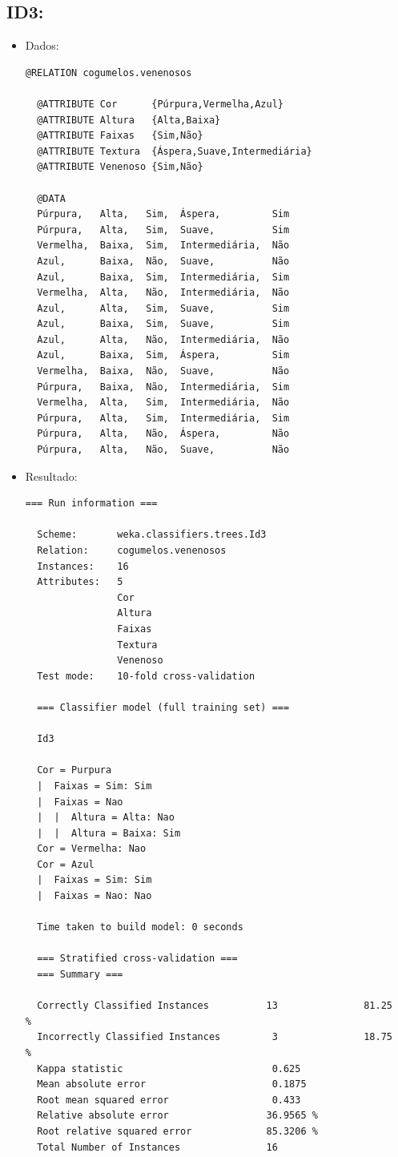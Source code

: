 \documentclass[
    article,            %
    11pt,               %
    oneside,            %
    a4paper,            %
    english,            %
    brazil,             %
    sumario=tradicional,
    ]{abntex2}
\begin{document}
\subsection{\textbf{ID3:}}
\begin{itemize}
  \item Dados:
  \begin{Verbatim}[frame=single, fontsize=\tiny]
  @RELATION cogumelos.venenosos

  @ATTRIBUTE Cor      {Púrpura,Vermelha,Azul}
  @ATTRIBUTE Altura   {Alta,Baixa}
  @ATTRIBUTE Faixas   {Sim,Não}
  @ATTRIBUTE Textura  {Áspera,Suave,Intermediária}
  @ATTRIBUTE Venenoso {Sim,Não}

  @DATA
  Púrpura,   Alta,   Sim,  Áspera,         Sim
  Púrpura,   Alta,   Sim,  Suave,          Sim
  Vermelha,  Baixa,  Sim,  Intermediária,  Não
  Azul,      Baixa,  Não,  Suave,          Não
  Azul,      Baixa,  Sim,  Intermediária,  Sim
  Vermelha,  Alta,   Não,  Intermediária,  Não
  Azul,      Alta,   Sim,  Suave,          Sim
  Azul,      Baixa,  Sim,  Suave,          Sim
  Azul,      Alta,   Não,  Intermediária,  Não
  Azul,      Baixa,  Sim,  Áspera,         Sim
  Vermelha,  Baixa,  Não,  Suave,          Não
  Púrpura,   Baixa,  Não,  Intermediária,  Sim
  Vermelha,  Alta,   Sim,  Intermediária,  Não
  Púrpura,   Alta,   Sim,  Intermediária,  Sim
  Púrpura,   Alta,   Não,  Áspera,         Não
  Púrpura,   Alta,   Não,  Suave,          Não
  \end{Verbatim}
\newpage
  \item Resultado:
  \begin{Verbatim}[frame=single, fontsize=\tiny]
  === Run information ===

  Scheme:       weka.classifiers.trees.Id3 
  Relation:     cogumelos.venenosos
  Instances:    16
  Attributes:   5
                Cor
                Altura
                Faixas
                Textura
                Venenoso
  Test mode:    10-fold cross-validation

  === Classifier model (full training set) ===

  Id3

  Cor = Purpura
  |  Faixas = Sim: Sim
  |  Faixas = Nao
  |  |  Altura = Alta: Nao
  |  |  Altura = Baixa: Sim
  Cor = Vermelha: Nao
  Cor = Azul
  |  Faixas = Sim: Sim
  |  Faixas = Nao: Nao

  Time taken to build model: 0 seconds

  === Stratified cross-validation ===
  === Summary ===

  Correctly Classified Instances          13               81.25   %
  Incorrectly Classified Instances         3               18.75   %
  Kappa statistic                          0.625 
  Mean absolute error                      0.1875
  Root mean squared error                  0.433 
  Relative absolute error                 36.9565 %
  Root relative squared error             85.3206 %
  Total Number of Instances               16     


\end{Verbatim}
\end{itemize}
\end{document}
